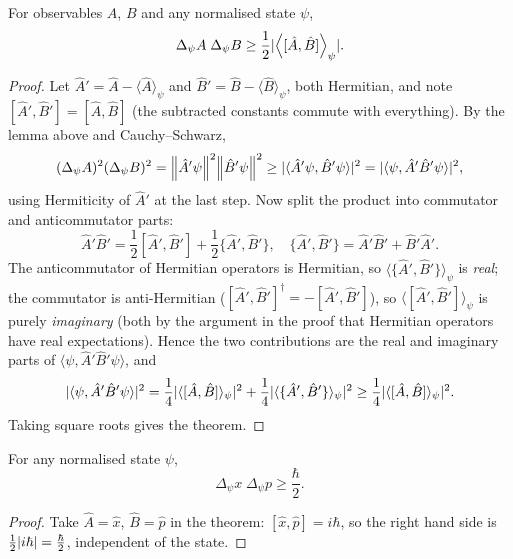 \documentclass[a4paper]{scrartcl}
\newcommand{\inp}[2]{\langle #1, #2 \rangle}
\begin{document}
\begin{theorem}
    For observables $A$, $B$ and any normalised state $\psi$,
    $$
    \Delta_\psi A \; \Delta_\psi B \geq \frac{1}{2} \lvert \left\langle [\hat{A}, \hat{B}] \right\rangle_\psi \rvert.
    $$
\end{theorem}
\begin{proof}
    Let $\hat{A}' = \hat{A} - \langle \hat{A}\rangle_\psi$ and $\hat{B}' = \hat{B} - \langle \hat{B} \rangle_\psi$, both Hermitian, and note $[\hat{A}', \hat{B}'] = [\hat{A}, \hat{B}]$ (the subtracted constants commute with everything). By the lemma above and Cauchy--Schwarz,
    $$
    (\Delta_\psi A)^2 (\Delta_\psi B)^2 = \norm{\hat{A}'\psi}^2 \norm{\hat{B}'\psi}^2 \geq \abs{\inp{\hat{A}'\psi}{\hat{B}'\psi}}^2 = \abs{\inp{\psi}{\hat{A}'\hat{B}'\psi}}^2,
    $$
    using Hermiticity of $\hat{A}'$ at the last step. Now split the product into commutator and anticommutator parts:
    $$
    \hat{A}'\hat{B}' = \frac{1}{2}[\hat{A}', \hat{B}'] + \frac{1}{2}\{\hat{A}', \hat{B}'\}, \quad \{\hat{A}', \hat{B}'\} = \hat{A}'\hat{B}' + \hat{B}'\hat{A}'.
    $$
    The anticommutator of Hermitian operators is Hermitian, so $\langle \{\hat{A}', \hat{B}'\}\rangle_\psi$ is \emph{real}; the commutator is anti-Hermitian ($[\hat{A}', \hat{B}']^\dagger = -[\hat{A}', \hat{B}']$), so $\langle [\hat{A}', \hat{B}'] \rangle_\psi$ is purely \emph{imaginary} (both by the argument in the proof that Hermitian operators have real expectations). Hence the two contributions are the real and imaginary parts of $\inp{\psi}{\hat{A}'\hat{B}'\psi}$, and
    $$
    \abs{\inp{\psi}{\hat{A}'\hat{B}'\psi}}^2 = \frac{1}{4}\abs{\langle [\hat{A}, \hat{B}] \rangle_\psi}^2 + \frac{1}{4}\abs{\langle \{\hat{A}', \hat{B}'\} \rangle_\psi}^2 \geq \frac{1}{4}\abs{\langle [\hat{A}, \hat{B}] \rangle_\psi}^2.
    $$
    Taking square roots gives the theorem.
\end{proof}

\begin{corollary}
    For any normalised state $\psi$,
    $$
    \Delta_\psi x \; \Delta_\psi p \geq \frac{\hbar}{2}.
    $$
\end{corollary}
\begin{proof}
    Take $\hat{A} = \hat{x}$, $\hat{B} = \hat{p}$ in the theorem: $[\hat{x}, \hat{p}] = i\hbar$, so the right hand side is $\frac{1}{2}\lvert i\hbar\rvert = \frac{\hbar}{2}$, independent of the state.
\end{proof}
\end{document}
